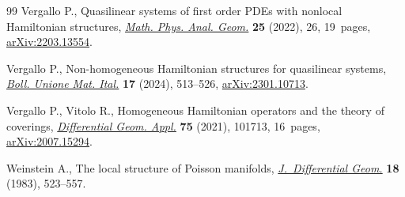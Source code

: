 \documentclass[pdftex]{sigma}
\numberwithin{equation}{section}
\begin{document}
\begin{thebibliography}{99}
Vergallo P., Quasilinear systems of first order {PDE}s with nonlocal
 {H}amiltonian structures, \href{https://doi.org/10.1007/s11040-022-09438-1}{\textit{Math. Phys. Anal. Geom.}} \textbf{25}
 (2022), 26, 19~pages, \href{https://arxiv.org/abs/2203.13554}{arXiv:2203.13554}.

Vergallo P., Non-homogeneous {H}amiltonian structures for quasilinear systems,
 \href{https://doi.org/10.1007/s40574-023-00369-5}{\textit{Boll. Unione Mat. Ital.}} \textbf{17} (2024), 513--526,
 \href{https://arxiv.org/abs/2301.10713}{arXiv:2301.10713}.

Vergallo P., Vitolo R., Homogeneous {H}amiltonian operators and the theory of
 coverings, \href{https://doi.org/10.1016/j.difgeo.2020.101713}{\textit{Differential Geom. Appl.}} \textbf{75} (2021), 101713,
 16~pages, \href{https://arxiv.org/abs/2007.15294}{arXiv:2007.15294}.

Weinstein A., The local structure of {P}oisson manifolds,
 \href{https://doi.org/10.4310/jdg/1214437787}{\textit{J.~Differential Geom.}} \textbf{18} (1983), 523--557.

\end{thebibliography}\LastPageEnding
\end{document}

